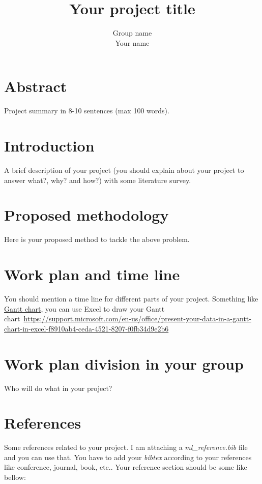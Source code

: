 \documentclass[11pt, oneside]{article}   	%
\title{Your project title}
\author{Group name\\
Your name}
\begin{document}
\maketitle

\section*{Abstract}

Project summary in 8-10 sentences (max 100 words).

\section{Introduction}
A brief description of your project (you should explain about your project to answer what?, why? and how?) with some literature survey.

\section{Proposed methodology}
Here is your proposed method to tackle the above problem. 

\section{Work plan and time line}

You should mention a time line for different parts of your project. Something like \href{https://en.wikipedia.org/wiki/Gantt_chart}{Gantt chart}, you can use Excel to draw your Gantt chart~\url{https://support.microsoft.com/en-us/office/present-your-data-in-a-gantt-chart-in-excel-f8910ab4-ceda-4521-8207-f0fb34d9e2b6} 


\section{Work plan division in your group}

Who will do what in your project?

\section{References}

Some references related to your project. I am attaching a \textit{ml\_reference.bib} file and you can use that. You have to add your \textit{bibtex} according to your references {like conference, journal, book, etc.}. Your reference section should be some like bellow:


\nocite{*}%
	

\end{document}
